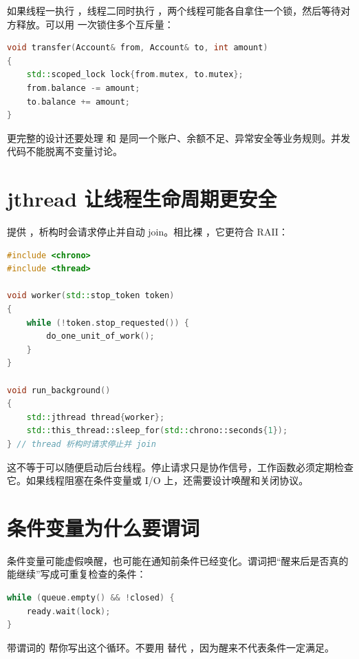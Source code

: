 如果线程一执行 ，线程二同时执行 ，两个线程可能各自拿住一个锁，然后等待对方释放。可以用  一次锁住多个互斥量：

\begin{lstlisting}[language=C++,caption={作用域锁同时获取多个锁}]
void transfer(Account& from, Account& to, int amount)
{
    std::scoped_lock lock{from.mutex, to.mutex};
    from.balance -= amount;
    to.balance += amount;
}
\end{lstlisting}

更完整的设计还要处理  和  是同一个账户、余额不足、异常安全等业务规则。并发代码不能脱离不变量讨论。

\section{jthread 让线程生命周期更安全}

 提供 ，析构时会请求停止并自动 join。相比裸 ，它更符合 RAII：

\begin{lstlisting}[language=C++,caption={jthread 自动 join}]
#include <chrono>
#include <thread>

void worker(std::stop_token token)
{
    while (!token.stop_requested()) {
        do_one_unit_of_work();
    }
}

void run_background()
{
    std::jthread thread{worker};
    std::this_thread::sleep_for(std::chrono::seconds{1});
} // thread 析构时请求停止并 join
\end{lstlisting}

这不等于可以随便启动后台线程。停止请求只是协作信号，工作函数必须定期检查它。如果线程阻塞在条件变量或 I/O 上，还需要设计唤醒和关闭协议。

\section{条件变量为什么要谓词}

条件变量可能虚假唤醒，也可能在通知前条件已经变化。谓词把“醒来后是否真的能继续”写成可重复检查的条件：

\begin{lstlisting}[language=C++,caption={wait 等价于循环检查}]
while (queue.empty() && !closed) {
    ready.wait(lock);
}
\end{lstlisting}

带谓词的  帮你写出这个循环。不要用  替代 ，因为醒来不代表条件一定满足。

